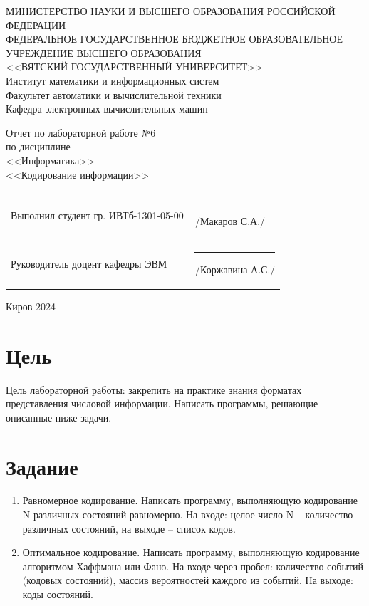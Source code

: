 \documentclass[a4paper,14pt]{extarticle}
\begin{document}
	
	\newpage\thispagestyle{empty}
	\begin{center}
		\MakeUppercase{
			Министерство науки и высшего образования Российской Федерации\\
			Федеральное государственное бюджетное образовательное учреждение высшего образования\\
			<<Вятский Государственный Университет>>\\
		}
		Институт математики и информационных систем\\
		Факультет автоматики и вычислительной техники\\
		Кафедра электронных вычислительных машин
	\end{center}
	\vfill
	
	\begin{center}
		Отчет по лабораторной работе №6\\
		по дисциплине\\
		<<Информатика>>\\
		<<Кодирование информации>>
	\end{center}
	\vfill
	
	\noindent
	\begin{tabular}{ll}
		Выполнил студент гр. ИВТб-1301-05-00 \hspace{5mm} &
		\rule[-1mm]{25mm}{0.10mm}\,/Макаров С.А./\\
		
		Руководитель доцент кафедры ЭВМ & \rule[-1mm]{25mm}{0.10mm}\,/Коржавина А.С./\\
	\end{tabular}
	
	\vfill
	\begin{center}
		Киров 2024
	\end{center}
	
	\newpage
	\section*{Цель}
	Цель лабораторной работы: закрепить на практике знания форматах представления числовой информации. Написать программы, решающие описанные ниже задачи.
	
	\section*{Задание}
	\begin{enumerate}
		\item Равномерное кодирование. Написать программу, выполняющую кодирование N различных состояний равномерно. На входе: целое число N -- количество различных состояний, на выходе -- список кодов.
		
		\item Оптимальное кодирование. Написать программу, выполняющую кодирование алгоритмом Хаффмана или Фано. На входе через пробел: количество событий (кодовых состояний), массив вероятностей каждого из событий. На выходе: коды состояний.
	\end{enumerate}
	
\end{document}
